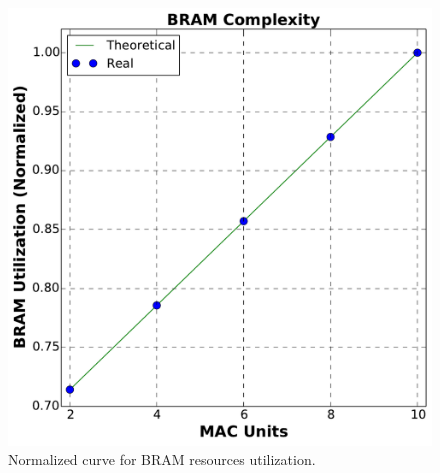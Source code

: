 \documentclass[conference,compsoc]{IEEEtran}
\begin{document}
\begin{figure}[!t]
\centering
\includegraphics[scale=0.3]{BRAM_c2}
\caption{Normalized curve for BRAM resources utilization.}
\label{bram_n}
\end{figure}

%
%
\end{document}
